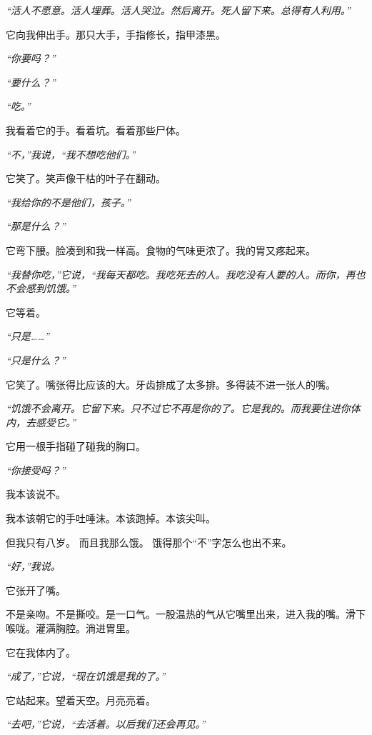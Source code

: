 \noindent \textit{“活人不愿意。活人埋葬。活人哭泣。然后离开。死人留下来。总得有人利用。”}

\noindent 它向我伸出手。那只大手，手指修长，指甲漆黑。

\noindent \textit{“你要吗？”}

\noindent \textit{“要什么？”}

\noindent \textit{“吃。”}

\noindent 我看着它的手。看着坑。看着那些尸体。

\noindent \textit{“不，”我说，“我不想吃他们。”}

\noindent 它笑了。笑声像干枯的叶子在翻动。

\noindent \textit{“我给你的不是他们，孩子。”}

\noindent \textit{“那是什么？”}

\noindent 它弯下腰。脸凑到和我一样高。食物的气味更浓了。我的胃又疼起来。

\noindent \textit{“我替你吃，”它说，“我每天都吃。我吃死去的人。我吃没有人要的人。而你，再也不会感到饥饿。”}

\noindent 它等着。

\noindent \textit{“只是……”}

\noindent \textit{“只是什么？”}

\noindent 它笑了。嘴张得比应该的大。牙齿排成了太多排。多得装不进一张人的嘴。

\noindent \textit{“饥饿不会离开。它留下来。只不过它不再是你的了。它是我的。而我要住进你体内，去感受它。”}

\noindent 它用一根手指碰了碰我的胸口。

\noindent \textit{“你接受吗？”}

\noindent 我本该说不。

\noindent 我本该朝它的手吐唾沫。本该跑掉。本该尖叫。

\noindent 但我只有八岁。
而且我那么饿。
饿得那个“不”字怎么也出不来。

\noindent \textit{“好，”我说。}

\noindent 它张开了嘴。

\noindent 不是亲吻。不是撕咬。是一口气。一股温热的气从它嘴里出来，进入我的嘴。滑下喉咙。灌满胸腔。淌进胃里。

\noindent 它在我体内了。

\noindent \textit{“成了，”它说，“现在饥饿是我的了。”}

\noindent 它站起来。望着天空。月亮亮着。

\noindent \textit{“去吧，”它说，“去活着。以后我们还会再见。”}


